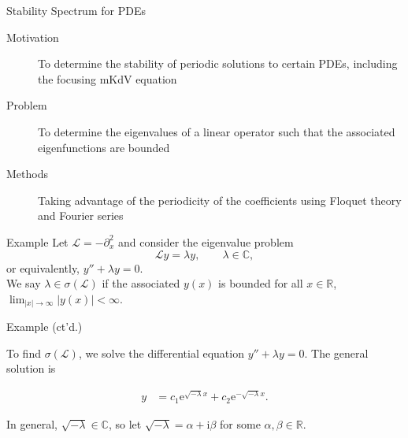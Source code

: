 \documentclass{beamer}
\newcommand{\abs}[1]{\left| #1 \right|}
\newcommand{\R}{\mathbb{R}}
\begin{document}

\begin{frame}{Stability Spectrum for PDEs}

\begin{description}

\item[Motivation] To determine the stability of periodic solutions to certain PDEs, including the focusing mKdV equation

\item[Problem] To determine the eigenvalues of a linear operator such that the associated eigenfunctions are bounded

\item[Methods] Taking advantage of the periodicity of the coefficients using Floquet theory and Fourier series

\end{description}

\end{frame}

\begin{frame}{Example}
  Let $\mathcal{L} = -\partial_{x}^2$ and consider the eigenvalue problem $$\mathcal{L}y = \lambda y, \qquad \lambda \in \mathbb{C},$$ or equivalently, $ y'' + \lambda y = 0$.
  \\
  \vspace{10mm}
  We say $\lambda \in \sigma(\mathcal{L})$ if the associated $y(x)$ is bounded for all $x\in \R$,  $\lim_{\abs{x}\to\infty}\abs{y(x)}<\infty$.
\end{frame}


\begin{frame}{Example (ct'd.)}

To find $\sigma(\mathcal{L})$, we solve the differential equation $ y'' + \lambda y = 0$. The general solution is \vspace*{-0.5cm}

\begin{align*}
 y &= c_1 \mathrm{e}^{\sqrt{-\lambda} x} + c_2 \mathrm{e}^{-\sqrt{-\lambda} x}. 
\end{align*}

In general, $\sqrt{-\lambda} \in \mathbb{C}$, so let $\sqrt{-\lambda} = \alpha + \mathrm{i} \beta$ for some $\alpha, \beta \in \mathbb{R}$.

\end{frame}
\end{document}
